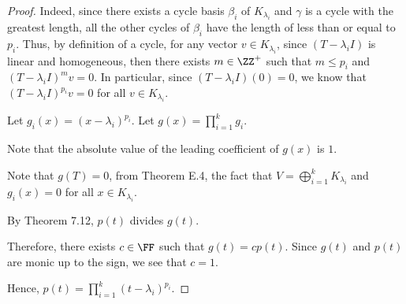 \documentclass[11pt]{scrartcl}
\begin{document}
\begin{proof}
  Indeed, since there exists a cycle basis $\beta_i$ of
  $K_{\lambda_i}$ and $\gamma$ is a cycle with the greatest length,
  all the other cycles of $\beta_i$ have the length of less than or
  equal to $p_i$. Thus, by definition of a cycle, for any vector
  $v\in K_{\lambda_i}$, since $(T-\lambda_i I)$ is linear and
  homogeneous, then there exists $m\in\ZZ^+$ such that $m \leq p_i$
  and $(T-\lambda_i I)^mv = 0$. In particular, since
  $(T-\lambda_i I)(0)=0$, we know that $(T-\lambda_i I)^{p_i}v = 0$
  for all $v\in K_{\lambda_i}$.

  Let $g_i(x) = (x-\lambda_i)^{p_i}$. Let $g(x) = \prod_{i=1}^kg_i$.

  Note that the absolute value of the leading coefficient of $g(x)$ is
  $1$.

  Note that $g(T) = 0$, from Theorem E.4, the fact that
  $V = \bigoplus_{i=1}^k K_{\lambda_i}$ and $g_i(x) = 0$ for all
  $x\in K_{\lambda_i}$.

  By Theorem 7.12, $p(t)$ divides $g(t)$.

  Therefore, there exists $c\in\FF$ such that $g(t) = cp(t)$. Since
  $g(t)$ and $p(t)$ are monic up to the sign, we see that $c = 1$.

  Hence,     $p(t) = \prod_{i=1}^k(t-\lambda_i)^{p_i}$.
\end{proof}
\end{document}
